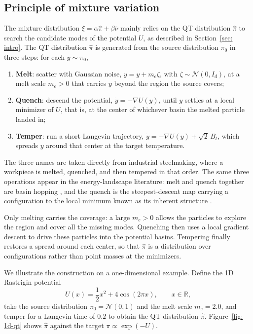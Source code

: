 \documentclass{article}
\begin{document}
\subsection{Principle of mixture variation}
\label{subsec: mixture-variation}

The mixture distribution $\xi = \alpha\hat\pi+\beta\bar\nu$ mainly relies on the QT distribution $\hat\pi$ to search the candidate modes of the potential $U$, as described in Section~\ref{sec: intro}. The QT distribution $\hat\pi$ is generated from the source distribution $\pi_0$ in three steps: for each $y\sim \pi_0$,
\begin{enumerate}
	\setlength{\itemsep}{0pt}
	\item \textbf{Melt}: scatter with Gaussian noise, $y = y+m_e\zeta$, with $\zeta\sim \mathcal N(0,I_d)$, at a melt scale $m_e>0$ that carries $y$ beyond the region the source covers;
	\item \textbf{Quench}: descend the potential, $\dot y = -\nabla U(y)$, until $y$ settles at a local minimizer of $U$, that is, at the center of whichever basin the melted particle landed in;
	\item \textbf{Temper}: run a short Langevin trajectory, $\dot y = -\nabla U(y)+\sqrt 2\,\dot B_t$, which spreads $y$ around that center at the target temperature.
\end{enumerate}
The three names are taken directly from industrial steelmaking, where a workpiece is melted, quenched, and then tempered in that order. {\color{blue}The same three operations appear in the energy-landscape literature: melt and quench together are basin hopping \citep{wales1997global}, and the quench is the steepest-descent map carrying a configuration to the local minimum known as its inherent structure \citep{stillinger1982hidden}.}

Only melting carries the coverage: a large $m_e>0$ allows the particles to explore the region and cover all the missing modes. Quenching then uses a local gradient descent to drive these particles into the potential basins. Tempering finally restores a spread around each center, so that $\hat\pi$ is a distribution over configurations rather than point masses at the minimizers.

We illustrate the construction on a one-dimensional example. Define the 1D Rastrigin potential
\begin{equation*}
	U(x) = \frac12x^2+4\cos(2\pi x), \qquad x\in \mathbb R,
\end{equation*}
take the source distribution $\pi_0 = \mathcal N(0,1)$ and the melt scale $m_e=2.0$, and temper for a Langevin time of $0.2$ to obtain the QT distribution $\hat\pi$. Figure~\ref{fig: 1d-qt} shows $\hat\pi$ against the target $\pi\propto\exp(-U)$.
\end{document}
